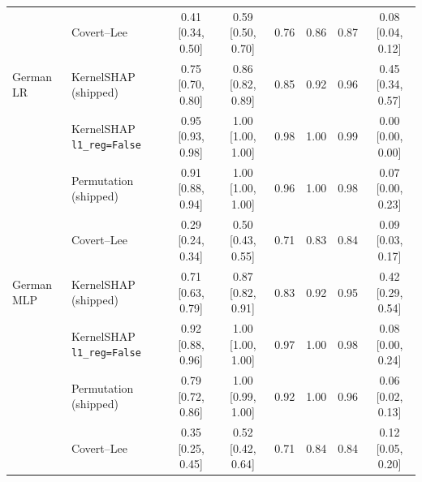 \begin{tabular}{@{}llcccccc@{}}
 & Covert--Lee & 0.41 [0.34, 0.50] & 0.59 [0.50, 0.70] & 0.76 & 0.86 & 0.87 & 0.08 [0.04, 0.12] \\
\addlinespace[2pt]
German LR & KernelSHAP (shipped) & 0.75 [0.70, 0.80] & 0.86 [0.82, 0.89] & 0.85 & 0.92 & 0.96 & 0.45 [0.34, 0.57] \\
 & KernelSHAP \texttt{l1\_reg=False} & 0.95 [0.93, 0.98] & 1.00 [1.00, 1.00] & 0.98 & 1.00 & 0.99 & 0.00 [0.00, 0.00] \\
 & Permutation (shipped) & 0.91 [0.88, 0.94] & 1.00 [1.00, 1.00] & 0.96 & 1.00 & 0.98 & 0.07 [0.00, 0.23] \\
 & Covert--Lee & 0.29 [0.24, 0.34] & 0.50 [0.43, 0.55] & 0.71 & 0.83 & 0.84 & 0.09 [0.03, 0.17] \\
\addlinespace[2pt]
German MLP & KernelSHAP (shipped) & 0.71 [0.63, 0.79] & 0.87 [0.82, 0.91] & 0.83 & 0.92 & 0.95 & 0.42 [0.29, 0.54] \\
 & KernelSHAP \texttt{l1\_reg=False} & 0.92 [0.88, 0.96] & 1.00 [1.00, 1.00] & 0.97 & 1.00 & 0.98 & 0.08 [0.00, 0.24] \\
 & Permutation (shipped) & 0.79 [0.72, 0.86] & 1.00 [0.99, 1.00] & 0.92 & 1.00 & 0.96 & 0.06 [0.02, 0.13] \\
 & Covert--Lee & 0.35 [0.25, 0.45] & 0.52 [0.42, 0.64] & 0.71 & 0.84 & 0.84 & 0.12 [0.05, 0.20] \\
\bottomrule
\end{tabular}
\endgroup
